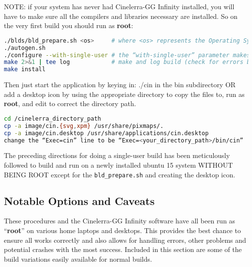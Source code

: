 NOTE: if your system has never had Cinelerra-GG Infinity installed, you will have to make sure all
the compilers and libraries necessary are installed. So on the very first build you should run as \textbf{root}:

\begin{lstlisting}[language=bash]
./blds/bld_prepare.sh <os>     # where <os> represents the Operating System of centos, fedora, suse, leap, ubuntu, debian.
./autogen.sh
./configure --with-single-user # the “with-single-user” parameter makes it so
make 2>&1 | tee log            # make and log build (check for errors before proceeding)
make install
\end{lstlisting}

Then just start the application by keying in: ./cin in the bin subdirectory OR add a desktop icon by
using the appropriate directory to copy the files to, run as \textbf{root}, and edit to correct the directory path.

\begin{lstlisting}[language=bash]
cd /cinelerra_directory_path
cp -a image/cin.{svg,xpm} /usr/share/pixmaps/.
cp -a image/cin.desktop /usr/share/applications/cin.desktop
change the “Exec=cin” line to be “Exec=<your_directory_path>/bin/cin”
\end{lstlisting}

The preceding directions for doing a single-user build has been meticulously followed to build and run
on a newly installed ubuntu 15 system WITHOUT BEING ROOT except for the \texttt{bld\_prepare.sh} and creating the desktop icon.

\subsection{Notable Options and Caveats}%
\label{sub:notable_options_and_caveats}

These procedures and the Cinelerra-GG Infinity software have all been run as “\textbf{root}” on various home laptops and desktops. This provides the best chance to ensure all works correctly and also allows for handling errors, other problems and potential crashes with the most success.  Included in this section are some of the build variations easily available for normal builds.

